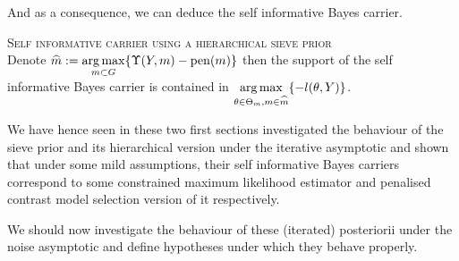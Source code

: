 And as a consequence, we can deduce the self informative Bayes carrier.

\begin{thm}{\textsc{Self informative carrier using a hierarchical sieve prior}\\}\label{THM_BAYES_HIERARCHICAL_LIMIT}
Denote $\widehat{m} := \operatorname*{arg\,max}\limits_{m \subset G} \{\Upsilon(Y, m) - \operatorname{pen}(m)\}$ then the support of the self informative Bayes carrier is contained in $\operatorname*{arg\,max}\limits_{\theta \in \Theta_{m}, m \in \widehat{m}}\{-l(\theta, Y)\}$.
\end{thm}

We have hence seen in these two first sections investigated the behaviour of the sieve prior and its hierarchical version under the iterative asymptotic and shown that under some mild assumptions, their self informative Bayes carriers correspond to some constrained maximum likelihood estimator and penalised contrast model selection version of it respectively.

We should now investigate the behaviour of these (iterated) posteriorii under the noise asymptotic and define hypotheses under which they behave properly.
